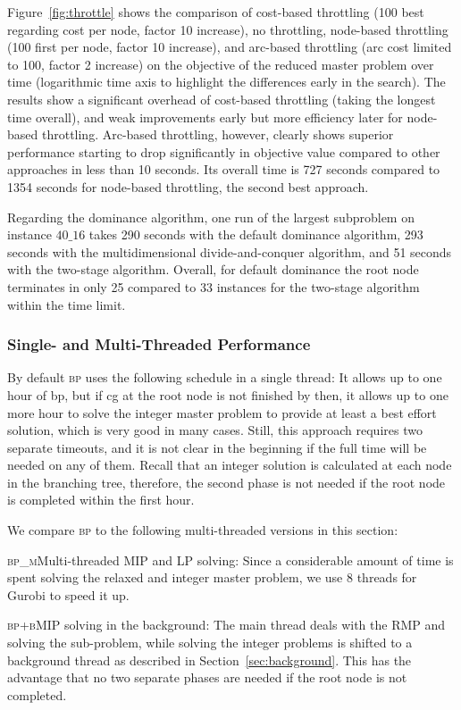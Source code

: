 \documentclass[]{amsart}
\newcommand{\bpplain}{\textsc{bp}\xspace}
\newcommand{\bpmulti}{\textsc{bp\_m}\xspace}
\newcommand{\bpbg}{\textsc{bp+b}\xspace}
\theoremstyle{plain}
\begin{document}
Figure~\ref{fig:throttle} shows the comparison of cost-based throttling (100 best regarding cost per node, factor 10 increase), no throttling, node-based throttling (100 first per node, factor 10 increase), and arc-based throttling (arc cost limited to 100, factor 2 increase) on the objective of the reduced master problem over time (logarithmic time axis to highlight the differences early in the search). The results show a significant overhead of cost-based throttling (taking the longest time overall), and weak improvements early but more efficiency later for node-based throttling. Arc-based throttling, however, clearly shows superior performance starting to drop significantly in objective value compared to other approaches in less than 10 seconds. Its overall time is 727 seconds compared to 1354 seconds for node-based throttling, the second best approach.

Regarding the dominance algorithm, one run of the largest subproblem on instance $40\_16$ takes 290 seconds with the default dominance algorithm, 293 seconds with the multidimensional divide-and-conquer algorithm, and 51 seconds with the two-stage algorithm. Overall, for default dominance the root node terminates in only 25 compared to 33 instances for the two-stage algorithm within the time limit.

\subsubsection{Single- and Multi-Threaded Performance}

By default \bpplain uses the following schedule in a single thread: It allows up to one hour of \gls{bp}, but if \acrlong{cg} at the root node is not finished by then, it allows up to one more hour to solve the integer master problem to provide at least a best effort solution, which is very good in many cases. Still, this approach requires two separate timeouts, and it is not clear in the beginning if the full time will be needed on any of them. Recall that an integer solution is calculated at each node in the branching tree, therefore, the second phase is not needed if the root node is completed within the first hour.

We compare \bpplain to the following multi-threaded versions in this section:
\begin{description}
    \item \bpmulti\quad Multi-threaded MIP and LP solving: Since a considerable amount of time is spent solving the relaxed and integer master problem, we use $8$ threads for Gurobi to speed it up.
    \item \bpbg\quad MIP solving in the background: The main thread deals with the RMP and solving the sub-problem, while solving the integer problems is shifted to a background thread as described in Section~\ref{sec:background}. This has the advantage that no two separate phases are needed if the root node is not completed.
\end{description}
\end{document}
